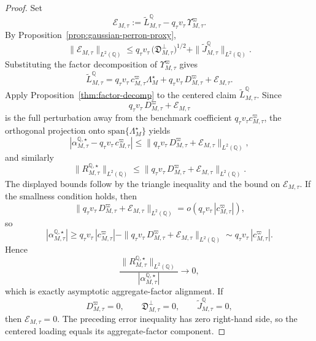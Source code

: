 \documentclass[11pt,a4paper]{amsart}
\theoremstyle{plain}
\theoremstyle{definition}
\theoremstyle{remark}
\newcommand{\QQ}{\mathbb{Q}}
\begin{document}
\begin{proof}
Set
\[
        \mathcal E_{M,\tau}
        :=
        \widetilde L_{M,\tau}^\QQ-q_\tau v_\tau\,\Upsilon_{M,\tau}^\varpi.
\]
By Proposition~\ref{prop:gaussian-perron-proxy},
\[
        \|\mathcal E_{M,\tau}\|_{L^2(\QQ)}
        \le
        q_\tau v_\tau\,\bigl(\mathfrak D_{M,\tau}^\perp\bigr)^{1/2}
        +
        \|\widetilde J_{M,\tau}^\QQ\|_{L^2(\QQ)}.
\]
Substituting the factor decomposition of \(\Upsilon_{M,\tau}^\varpi\) gives
\[
        \widetilde L_{M,\tau}^\QQ
        =
        q_\tau v_\tau\,c_{M,\tau}^\varpi\Lambda_M^\star
        +
        q_\tau v_\tau\,D_{M,\tau}^\varpi
        +
        \mathcal E_{M,\tau}.
\]
Apply Proposition~\ref{thm:factor-decomp} to the centered claim \(\widetilde L_{M,\tau}^\QQ\).  Since
\[
        q_\tau v_\tau\,D_{M,\tau}^\varpi+\mathcal E_{M,\tau}
\]
is the full perturbation away from the benchmark coefficient \(q_\tau v_\tau c_{M,\tau}^\varpi\),
the orthogonal projection onto \(\mathrm{span}\{\Lambda_M^\star\}\) yields
\[
        \left|
                \alpha_{M,\tau}^{\QQ,\star}
                -
                q_\tau v_\tau\,c_{M,\tau}^\varpi
        \right|
        \le
        \|q_\tau v_\tau\,D_{M,\tau}^\varpi+\mathcal E_{M,\tau}\|_{L^2(\QQ)},
\]
and similarly
\[
        \|R_{M,\tau}^{\QQ,\star}\|_{L^2(\QQ)}
        \le
        \|q_\tau v_\tau\,D_{M,\tau}^\varpi+\mathcal E_{M,\tau}\|_{L^2(\QQ)}.
\]
The displayed bounds follow by the triangle inequality and the bound on \(\mathcal E_{M,\tau}\).
If the smallness condition holds, then
\[
        \|q_\tau v_\tau\,D_{M,\tau}^\varpi+\mathcal E_{M,\tau}\|_{L^2(\QQ)}
        =
        o\!\left(q_\tau v_\tau\,|c_{M,\tau}^\varpi|\right),
\]
so
\[
        |\alpha_{M,\tau}^{\QQ,\star}|
        \ge
        q_\tau v_\tau\,|c_{M,\tau}^\varpi|
        -
        \|q_\tau v_\tau\,D_{M,\tau}^\varpi+\mathcal E_{M,\tau}\|_{L^2(\QQ)}
        \sim
        q_\tau v_\tau\,|c_{M,\tau}^\varpi|.
\]
Hence
\[
        \frac{\|R_{M,\tau}^{\QQ,\star}\|_{L^2(\QQ)}}{|\alpha_{M,\tau}^{\QQ,\star}|}\to0,
\]
which is exactly asymptotic aggregate-factor alignment.  If
\[
        D_{M,\tau}^\varpi=0,
        \qquad
        \mathfrak D_{M,\tau}^\perp=0,
        \qquad
        \widetilde J_{M,\tau}^\QQ=0,
\]
then \(\mathcal E_{M,\tau}=0\).  The preceding error inequality has zero right-hand side, so the
centered loading equals its aggregate-factor component.
\end{proof}
\end{document}
